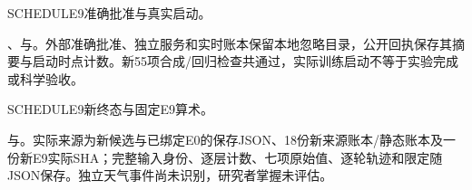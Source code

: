 \documentclass[UTF8,10.5pt,a4paper,fontset=none]{ctexart}
\begin{document}
\begin{description}[leftmargin=2.7em,labelwidth=2.2em,itemsep=0pt]
\item[S38] SCHEDULE9准确批准与真实启动。\par{}\par{}、与。外部准确批准、独立服务和实时账本保留本地忽略目录，公开回执保存其摘要与启动时点计数。新55项合成/回归检查共通过，实际训练启动不等于实验完成或科学验收。
\item[S39] SCHEDULE9新终态与固定E9算术。\par{}\par{}\par{}与。实际来源为新候选与已绑定E0的保存JSON、18份新来源账本/静态账本及一份新E9实际SHA；完整输入身份、逐层计数、七项原始值、逐轮轨迹和限定随JSON保存。独立天气事件尚未识别，研究者掌握未评估。
\end{description}
\normalsize
\end{document}

